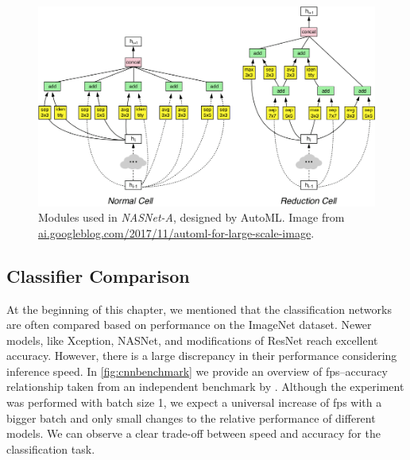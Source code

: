 \begin{figure}
    \includegraphics[width=\textwidth]{img/nasnet}
    \caption[NASNet-A modules]
    {Modules used in \textit{NASNet-A}, designed by AutoML. Image from \url{ai.googleblog.com/2017/11/automl-for-large-scale-image}.}
    \label{fig:nasnet}
\end{figure}

\subsection{Classifier Comparison}
\label{sec:cnncomp}
At the beginning of this chapter, we mentioned that the classification networks are often compared based on performance on the ImageNet dataset. Newer models, like Xception, NASNet, and modifications of ResNet reach excellent accuracy. However, there is a large discrepancy in their performance considering inference speed. In \cref{fig:cnnbenchmark} we provide an overview of fps--accuracy relationship taken from an independent benchmark by \citeauthor{bib:cnnbenchmark} \cite{bib:cnnbenchmark}. Although the experiment was performed with batch size 1, we expect a universal increase of fps with a bigger batch and only small changes to the relative performance of different models. We can observe a clear trade-off between speed and accuracy for the classification task.

